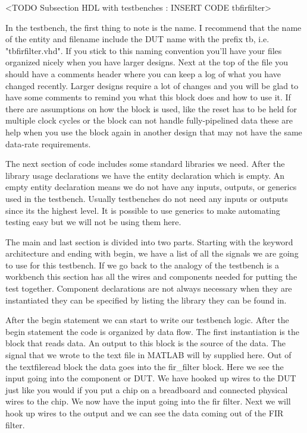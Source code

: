 <TODO Subsection HDL with testbenches : INSERT CODE tbfirfilter>

In the testbench, the first thing to note is the name. I recommend that the name of the entity and filename include the \ac{DUT} name with the prefix tb, i.e. "tbfirfilter.vhd". If you stick to this naming convention you'll have your files organized nicely when you have larger designs. Next at the top of the file you should have a comments header where you can keep a log of what you have changed recently. Larger designs require a lot of changes and you will be glad to have some comments to remind you what this block does and how to use it. If there are assumptions on how the block is used, like the reset has to be held for multiple clock cycles or the block can not handle fully-pipelined data these are help when you use the block again in another design that may not have the same data-rate requirements.

The next section of code includes some standard libraries we need. After the library usage declarations we have the entity declaration which is empty. An empty entity declaration means we do not have any inputs, outputs, or generics used in the testbench. Usually testbenches do not need any inputs or outputs since its the highest level. It is possible to use generics to make automating testing easy but we will not be using them here.

The main and last section is divided into two parts. Starting with the keyword architecture and ending with begin, we have a list of all the signals we are going to use for this testbench. If we go back to the analogy of the testbench is a workbench this section has all the wires and components needed for putting the test together. Component declarations are not always necessary when they are instantiated they can be specified by listing the library they can be found in.

After the begin statement we can start to write our testbench logic. After the begin statement the code is organized by data flow. The first instantiation is the block that reads data. An output to this block is the source of the data. The signal that we wrote to the text file in MATLAB will by supplied here. Out of the textfileread block the data goes into the fir\_filter block. Here we see the input going into the component or \ac{DUT}. We have hooked up wires to the \ac{DUT} just like you would if you put a chip on a breadboard and connected physical wires to the chip. We now have the input going into the fir filter. Next we will hook up wires to the output and we can see the data coming out of the \ac{FIR} filter.

